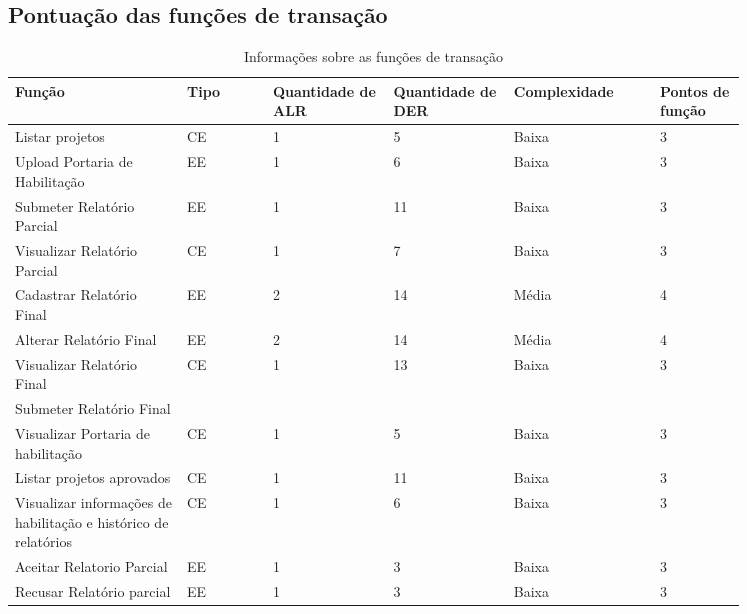    \subsection{Pontuação das funções de transação}
   
	\begin{table*}[!h]
	\centering
	\caption{Informações sobre as funções de transação}
	\label{funcoes_transacao}
	  \begin{tabular}{p{0.20\linewidth}p{0.10\linewidth}p{0.14\linewidth}p{0.14\linewidth}p{0.17\linewidth}p{0.10\linewidth}}
	\hline
	\textbf{Função} & \textbf{Tipo} & \textbf{Quantidade de ALR} & \textbf{Quantidade de DER} & \textbf{Complexidade} & \textbf{Pontos de função} \\
	\hline
	Listar projetos & CE & 1 & 5 & Baixa & 3 \\
	\hline
	Upload Portaria de Habilitação & EE & 1 & 6 & Baixa & 3 \\
	\hline
	Submeter Relatório Parcial & EE & 1 & 11 & Baixa & 3 \\
	\hline
	Visualizar Relatório Parcial & CE & 1 & 7 & Baixa & 3 \\
	\hline
	Cadastrar Relatório Final & EE & 2 & 14 & Média & 4 \\
	\hline
	Alterar Relatório Final & EE & 2 & 14 & Média & 4 \\
	\hline
	Visualizar Relatório Final & CE & 1 & 13 & Baixa & 3 \\
	\hline
	Submeter Relatório Final &  &  &  &  &  \\
	\hline
	Visualizar Portaria de habilitação & CE & 1 & 5 & Baixa & 3 \\
	\hline
	Listar projetos aprovados & CE & 1 & 11 & Baixa & 3 \\
	\hline
	Visualizar informações de habilitação e histórico de relatórios & CE & 1 & 6 & Baixa & 3 \\
	\hline
	Aceitar Relatorio Parcial & EE & 1 & 3 & Baixa & 3 \\
	\hline
	Recusar Relatório parcial & EE & 1 & 3 & Baixa & 3\\
	\end{tabular}
	\end{table*}

